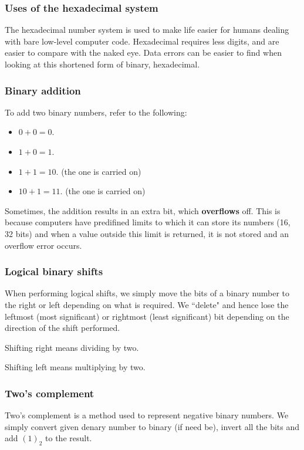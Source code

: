 \documentclass{article}
\begin{document}
\subsubsection{Uses of the hexadecimal system}
The hexadecimal number system is used to make life easier for humans dealing with 
bare low-level computer code. Hexadecimal requires less digits, and are easier to compare
with the naked eye. Data errors can be easier to find when looking at this shortened form
of binary, hexadecimal.

\subsubsection{Binary addition}
To add two binary numbers, refer to the following:\\
\begin{itemize}
	\item $0 + 0 = 0$.
	\item $1 + 0 = 1$.
	\item $1 + 1 = 10$. (the one is carried on)
	\item $10 + 1 = 11$. (the one is carried on)
\end{itemize}

Sometimes, the addition results in an extra bit, which \textbf{overflows} off. This is
because computers have predifined limits to which it can store its numbers (16, 32 bits)
and when a value outside this limit is returned, it is not stored and an overflow error
occurs.

\subsubsection{Logical binary shifts}
When performing logical shifts, we simply move the bits of a binary number to the right
or left depending on what is required. We ``delete" and hence lose the leftmost (most 
significant) or rightmost (least significant) bit depending on the direction of the shift 
performed.

Shifting right means dividing by two.

Shifting left means multiplying by two.

\subsubsection{Two's complement}
Two's complement is a method used to represent negative binary numbers. We simply
convert given denary number to binary (if need be), invert all the bits and add $(1)_2$ 
to the result.
\end{document}
